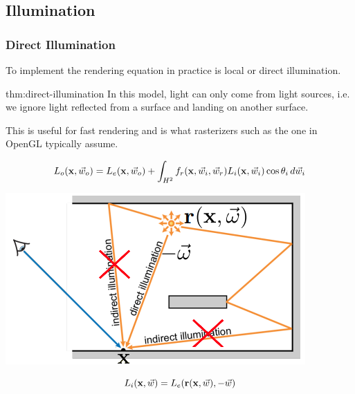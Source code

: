 \documentclass{article}
\begin{document}
\newpage

\subsection{Illumination}

\subsubsection{Direct Illumination}

To implement the rendering equation in practice is local or direct illumination.

\vspace{5px}

\begin{defin}{thm:direct-illumination}
    In this model, light can only come from light sources, i.e. we ignore light reflected from a surface 
    and landing on another surface.

    \vspace{5px}

    This is useful for fast rendering and is what rasterizers such as the one in OpenGL typically assume.

    \[
        L_o (\text{\textbf{x}}, \vec{w}_o) = L_e (\text{\textbf{x}}, \vec{w}_o) + \int_{H^2} f_r(\text{\textbf{x}}, \vec{w}_i, \vec{w}_r)L_i(\text{\textbf{x}}, \vec{w}_i) \cos \theta_i \, d \vec{w}_i
    \]

    \begin{minipage}{0.6\textwidth}
        \includegraphics[width=0.9\linewidth]{images/direct_illumination.png}
    \end{minipage}
    \begin{minipage}{0.3\textwidth}
        \[
            L_i (\text{\textbf{x}}, \vec{w}) = L_e (\mathbf{r}(\text{\textbf{x}}, \vec{w}), -\vec{w})
        \]
    \end{minipage}
\end{defin}
\end{document}
